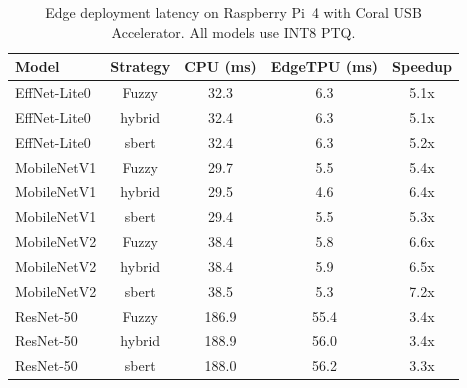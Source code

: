 \begin{table}[htbp]
\caption{Edge deployment latency on Raspberry Pi~4 with Coral USB Accelerator. All models use INT8 PTQ.}
\label{tab:edge_latency}
\begin{tabular}{lcccc}
\toprule
Model & Strategy & CPU (ms) & EdgeTPU (ms) & Speedup \\
\midrule
EffNet-Lite0 & Fuzzy & 32.3 & 6.3 & 5.1x \\
EffNet-Lite0 & hybrid & 32.4 & 6.3 & 5.1x \\
EffNet-Lite0 & sbert & 32.4 & 6.3 & 5.2x \\
MobileNetV1 & Fuzzy & 29.7 & 5.5 & 5.4x \\
MobileNetV1 & hybrid & 29.5 & 4.6 & 6.4x \\
MobileNetV1 & sbert & 29.4 & 5.5 & 5.3x \\
MobileNetV2 & Fuzzy & 38.4 & 5.8 & 6.6x \\
MobileNetV2 & hybrid & 38.4 & 5.9 & 6.5x \\
MobileNetV2 & sbert & 38.5 & 5.3 & 7.2x \\
ResNet-50 & Fuzzy & 186.9 & 55.4 & 3.4x \\
ResNet-50 & hybrid & 188.9 & 56.0 & 3.4x \\
ResNet-50 & sbert & 188.0 & 56.2 & 3.3x \\
\bottomrule
\end{tabular}
\end{table}
